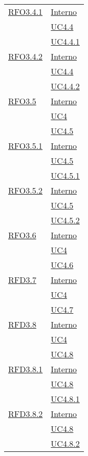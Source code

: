 \begin{longtable}{|>{\centering}m{5cm}|m{5cm}<{\centering}|}
\hyperlink{RFO3.4.1}{RFO3.4.1} & \hyperlink{Interno}{Interno}\\ &\hyperref[UC4.4]{UC4.4}\\ &\hyperref[UC4.4.1]{UC4.4.1}\\ \hline

\hyperlink{RFO3.4.2}{RFO3.4.2} &  \hyperlink{Interno}{Interno}\\ &\hyperref[UC4.4]{UC4.4}\\ &\hyperref[UC4.4.2]{UC4.4.2}\\ \hline

\hyperlink{RFO3.5}{RFO3.5} &  \hyperlink{Interno}{Interno}\\ &\hyperref[UC4]{UC4}\\ &\hyperref[UC4.5]{UC4.5}\\ \hline

\hyperlink{RFO3.5.1}{RFO3.5.1} &  \hyperlink{Interno}{Interno}\\ &\hyperref[UC4.5]{UC4.5}\\ &\hyperref[UC4.5.1]{UC4.5.1}\\ \hline

\hyperlink{RFO3.5.2}{RFO3.5.2} & \hyperlink{Interno}{Interno}\\ &\hyperref[UC4.5]{UC4.5}\\ &\hyperref[UC4.5.2]{UC4.5.2}\\ \hline

\hyperlink{RFO3.6}{RFO3.6} &   \hyperlink{Interno}{Interno}\\ &\hyperref[UC4]{UC4}\\ &\hyperref[UC4.6]{UC4.6}\\ \hline

\hyperlink{RFD3.7}{RFD3.7} & \hyperlink{Interno}{Interno}\\ &\hyperref[UC4]{UC4}\\ &\hyperref[UC4.7]{UC4.7}\\ \hline

\hyperlink{RFD3.8}{RFD3.8} &  \hyperlink{Interno}{Interno}\\ &\hyperref[UC4]{UC4}\\ &\hyperref[UC4.8]{UC4.8}\\ \hline

\hyperlink{RFD3.8.1}{RFD3.8.1} &   \hyperlink{Interno}{Interno}\\ &\hyperref[UC4.8]{UC4.8}\\ &\hyperref[UC4.8.1]{UC4.8.1}\\ \hline

\hyperlink{RFD3.8.2}{RFD3.8.2} &  \hyperlink{Interno}{Interno}\\ &\hyperref[UC4.8]{UC4.8}\\ &\hyperref[UC4.8.2]{UC4.8.2}\\ \hline


\end{longtable}
